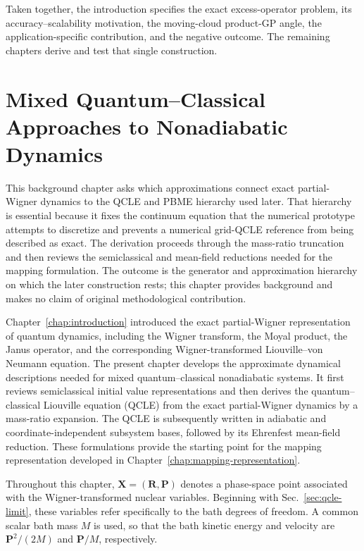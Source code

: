 \documentclass[
  11pt,
  letterpaper,
  onehalfspacing,
  normalmargins,
  equalmargins,
  oneside
]{ut-thesis}
\begin{document}
Taken together, the introduction specifies the exact excess-operator problem, its
accuracy--scalability motivation, the moving-cloud product-GP angle, the
application-specific contribution, and the negative outcome.  The remaining
chapters derive and test that single construction.

\chapter{Mixed Quantum--Classical Approaches to Nonadiabatic Dynamics}
\label{chap:semiclassical-qc-methods}

This background chapter asks which approximations connect exact
partial-Wigner dynamics to the QCLE and PBME hierarchy used later.  That
hierarchy is essential because it fixes the continuum equation that the
numerical prototype attempts to discretize and prevents a numerical grid-QCLE
reference from being described as exact.  The derivation proceeds through the
mass-ratio truncation and then reviews the semiclassical and mean-field
reductions needed for the mapping formulation.  The outcome is the generator
and approximation hierarchy on which the later construction rests; this
chapter provides background and makes no claim of original methodological
contribution.

Chapter~\ref{chap:introduction} introduced the exact partial-Wigner
representation of quantum dynamics, including the Wigner transform, the Moyal
product, the Janus operator, and the corresponding Wigner-transformed
Liouville--von Neumann equation. The present chapter develops the approximate
dynamical descriptions needed for mixed quantum--classical nonadiabatic
systems. It first reviews semiclassical initial value representations and then
derives the quantum--classical Liouville equation (QCLE) from the exact
partial-Wigner dynamics by a mass-ratio expansion. The QCLE is subsequently
written in adiabatic and coordinate-independent subsystem bases, followed by
its Ehrenfest mean-field reduction. These formulations provide the starting
point for the mapping representation developed in
Chapter~\ref{chap:mapping-representation}.

Throughout this chapter,
\(\mathbf X=(\mathbf R,\mathbf P)\) denotes a phase-space point associated
with the Wigner-transformed nuclear variables. Beginning with
Sec.~\ref{sec:qcle-limit}, these variables refer specifically to the bath
degrees of freedom. A common scalar bath mass \(M\) is used, so that the bath
kinetic energy and velocity are \(\mathbf P^2/(2M)\) and \(\mathbf P/M\),
respectively.
\end{document}
